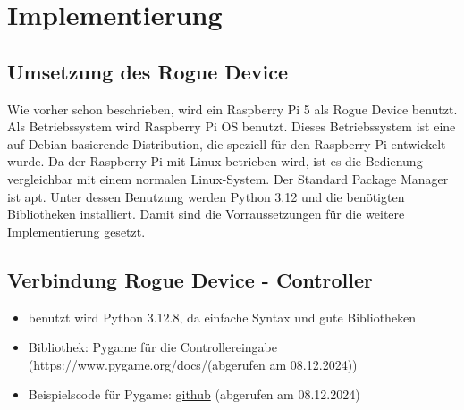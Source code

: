 \chapter{Implementierung}

\section{Umsetzung des Rogue Device}
Wie vorher schon beschrieben, wird ein Raspberry Pi 5 als Rogue Device benutzt. 
Als Betriebssystem wird Raspberry Pi OS benutzt. Dieses Betriebssystem ist eine auf Debian basierende Distribution, 
die speziell für den Raspberry Pi entwickelt wurde. Da der Raspberry Pi mit Linux betrieben wird, ist es die Bedienung
vergleichbar mit einem normalen Linux-System. Der Standard Package Manager ist apt. Unter dessen Benutzung werden 
Python 3.12 und die benötigten Bibliotheken installiert. Damit sind die Vorraussetzungen für die weitere Implementierung
gesetzt.


\section{Verbindung Rogue Device - Controller}
\begin{itemize}
    \item benutzt wird Python 3.12.8, da einfache Syntax und gute Bibliotheken
    \item Bibliothek: Pygame für die Controllereingabe (https://www.pygame.org/docs/(abgerufen am 08.12.2024))
    \item Beispielscode für Pygame: \href{https://github.com/kevinmcaleer/xbox_controller}{github} (abgerufen am 08.12.2024)
\end{itemize}

